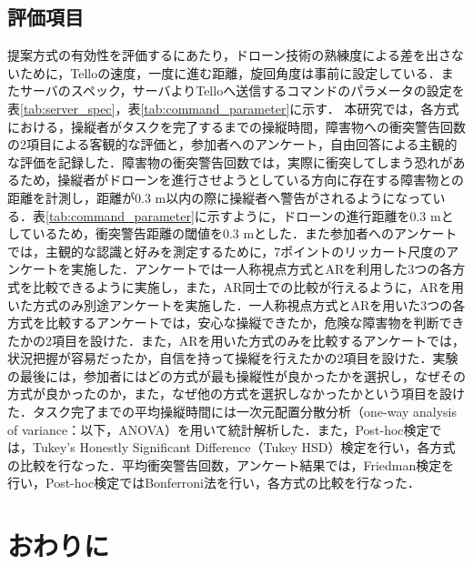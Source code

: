 \documentclass[a4paper,10pt,twocolumn,uplatex]{jsarticle}
\begin{document}
\subsection{評価項目}
提案方式の有効性を評価するにあたり，ドローン技術の熟練度による差を出さないために，Telloの速度，一度に進む距離，旋回角度は事前に設定している．またサーバのスペック，サーバよりTelloへ送信するコマンドのパラメータの設定を表\ref{tab:server_spec}，表\ref{tab:command_parameter}に示す．
本研究では，各方式における，操縦者がタスクを完了するまでの操縦時間，障害物への衝突警告回数の2項目による客観的な評価と，参加者へのアンケート，自由回答による主観的な評価を記録した．障害物の衝突警告回数では，実際に衝突してしまう恐れがあるため，操縦者がドローンを進行させようとしている方向に存在する障害物との距離を計測し，距離が0.3 m以内の際に操縦者へ警告がされるようになっている．表\ref{tab:command_parameter}に示すように，ドローンの進行距離を0.3 mとしているため，衝突警告距離の閾値を0.3 mとした．また参加者へのアンケートでは，主観的な認識と好みを測定するために，7ポイントのリッカート尺度のアンケートを実施した．アンケートでは一人称視点方式とARを利用した3つの各方式を比較できるように実施し，また，AR同士での比較が行えるように，ARを用いた方式のみ別途アンケートを実施した．一人称視点方式とARを用いた3つの各方式を比較するアンケートでは，安心な操縦できたか，危険な障害物を判断できたかの2項目を設けた．また，ARを用いた方式のみを比較するアンケートでは，状況把握が容易だったか，自信を持って操縦を行えたかの2項目を設けた．実験の最後には，参加者にはどの方式が最も操縦性が良かったかを選択し，なぜその方式が良かったのか，また，なぜ他の方式を選択しなかったかという項目を設けた．タスク完了までの平均操縦時間には一次元配置分散分析（one-way analysis of variance：以下，ANOVA）を用いて統計解析した．また，Post-hoc検定では，Tukey’s Honestly Significant Difference（Tukey HSD）検定を行い，各方式の比較を行なった．平均衝突警告回数，アンケート結果では，Friedman検定を行い，Post-hoc検定ではBonferroni法を行い，各方式の比較を行なった．



\section{おわりに}
\end{document}
